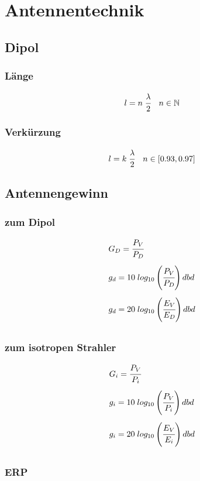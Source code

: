 \documentclass[12pt,a5paper,ngerman,titlepage]{article}
\begin{document}
\newpage
\section{Antennentechnik}

\subsection{Dipol}
\subsubsection{Länge}
$$ l=n \; \cfrac{\lambda}{2}  \quad n \in \mathbb{N} $$

\subsubsection{Verkürzung}
$$ l = k \; \cfrac{\lambda}{2} \quad n \in [0.93,0.97]$$

\subsection{Antennengewinn}
\subsubsection{zum Dipol}
\begin{align*}
&G_{D} = \cfrac{P_{V}}{P_{D}} \\[5pt]
&g_{d} = 10 \; log_{10}\left(\cfrac{P_{V}}{P_{D}}\right)dbd \\[5pt]
&g_{d} = 20 \; log_{10}\left(\cfrac{E_{V}}{E_{D}}\right)dbd \\[5pt]
\end{align*}

\subsubsection{zum isotropen Strahler}
\begin{align*}
&G_{i} = \cfrac{P_{V}}{P_{i}} \\[5pt]
&g_{i} = 10 \; log_{10}\left(\cfrac{P_{V}}{P_{i}}\right)dbd \\[5pt]
&g_{i} = 20 \; log_{10}\left(\cfrac{E_{V}}{E_{i}}\right)dbd \\[5pt]
\end{align*}
\subsubsection{ERP}
\end{document}
